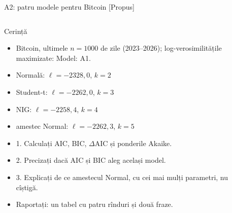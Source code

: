 \begin{frame}{A2: patru modele pentru Bitcoin [Propus]}
\propsub
\itemsize{\scriptsize}
\begin{columns}[T]
\begin{column}{\taskw}
\begin{block}{Cerință}
\begin{itemize}
    \item Bitcoin, ultimele $n = 1000$ de zile (2023--2026); log-verosimilitățile maximizate: Model: A1.
    \item Normală: $\ell = -2328{,}0$, $k = 2$
    \item Student-t: $\ell = -2262{,}0$, $k = 3$
    \item NIG: $\ell = -2258{,}4$, $k = 4$
    \item amestec Normal: $\ell = -2262{,}3$, $k = 5$
    \item 1. Calculați AIC, BIC, $\Delta$AIC și ponderile Akaike.
    \item 2. Precizați dacă AIC și BIC aleg același model.
    \item 3. Explicați de ce amestecul Normal, cu cei mai mulți parametri, nu cîștigă.
    \item Raportați: un tabel cu patru rînduri și două fraze.
\end{itemize}
\end{block}
\end{column}
\begin{column}{\solw}
\end{column}
\end{columns}
\end{frame}

